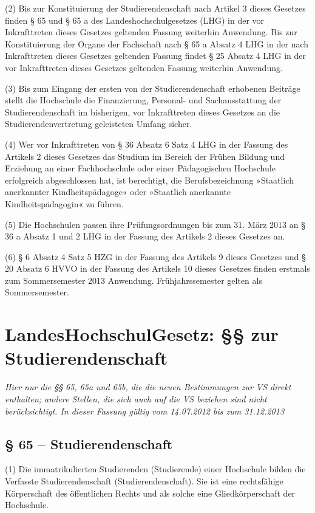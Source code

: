 \documentclass[
10pt,
a4paper,
twoside,								%
titlepage=false,							%
draft=false								%
]{scrartcl}
\begin{document}
(2) Bis zur Konstituierung der Studierendenschaft nach Artikel 3 dieses Gesetzes finden § 65 und § 65 a des Landeshochschulgesetzes (LHG) in der vor Inkrafttreten dieses Gesetzes geltenden Fassung weiterhin Anwendung. Bis zur Konstituierung der Organe der Fachschaft nach § 65 a Absatz 4 LHG in der nach Inkrafttreten dieses Gesetzes geltenden Fassung findet § 25 Absatz 4 LHG in der vor Inkrafttreten dieses Gesetzes geltenden Fassung weiterhin Anwendung. 

(3) Bis zum Eingang der ersten von der Studierendenschaft erhobenen Beiträge stellt die Hochschule die Finanzierung, Personal- und Sachausstattung der Studierendenschaft im bisherigen, vor Inkrafttreten dieses Gesetzes an die Studierendenvertretung geleisteten Umfang sicher.

(4) Wer vor Inkrafttreten von § 36 Absatz 6 Satz 4 LHG in der Fassung des Artikels 2 dieses Gesetzes das Studium im Bereich der Frühen Bildung und Erziehung an einer Fachhochschule oder einer Pädagogischen Hochschule erfolgreich abgeschlossen hat, ist berechtigt, die Berufsbezeichnung »Staatlich anerkannter Kindheitspädagoge« oder »Staatlich anerkannte Kindheitspädagogin« zu führen.

(5) Die Hochschulen passen ihre Prüfungsordnungen bis zum 31. März 2013 an § 36 a Absatz 1 und 2 LHG in der Fassung des Artikels 2 dieses Gesetzes an.

(6) § 6 Absatz 4 Satz 5 HZG in der Fassung des Artikels 9 dieses Gesetzes und § 20 Absatz 6 HVVO in der Fassung des Artikels 10 dieses Gesetzes finden erstmals zum Sommersemester 2013 Anwendung. Frühjahrssemester gelten als Sommersemester.


\section{LandesHochschulGesetz: §§ zur Studierendenschaft}

\emph{Hier nur die §§ 65, 65a und 65b, die die neuen Bestimmungen zur VS direkt enthalten; andere Stellen, die sich auch auf die VS beziehen sind nicht berücksichtigt. In dieser Fassung gültig vom 14.07.2012 bis zum 31.12.2013}

\subsection{§ 65 – Studierendenschaft}

(1) Die immatrikulierten Studierenden (Studierende) einer Hochschule bilden die Verfasste Studierendenschaft (Studierendenschaft). Sie ist eine rechtsfähige Körperschaft des öffentlichen Rechts und als solche eine Gliedkörperschaft der Hochschule.
\end{document}
